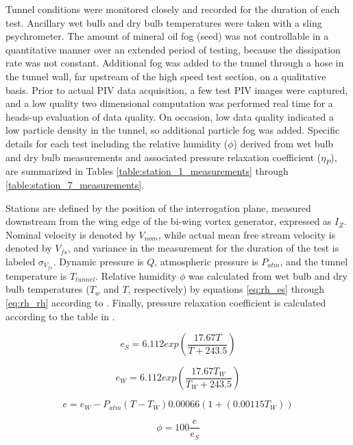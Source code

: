 Tunnel conditions were monitored closely and recorded for the duration of each 
test. Ancillary wet bulb and dry bulb temperatures were taken with a sling 
psychrometer. The amount of mineral oil fog (seed) was not controllable in a 
quantitative manner over an extended period of testing, because the dissipation 
rate was not constant. Additional fog was added to the tunnel through a hose in 
the tunnel wall, far upstream of the high speed test section, on a qualitative 
basis. Prior to actual PIV data acquisition, a few test PIV images 
were captured, and a low quality two dimensional computation was performed real 
time for a heads-up evaluation of data quality. 
On occasion, low data quality indicated a low particle density in the tunnel, 
so additional particle fog was added. 
Specific details for each test including the relative humidity ($\phi$) derived 
from wet bulb and dry bulb measurements and associated pressure relaxation 
coefficient 
($\eta_P$), are summarized in Tables \ref{table:station_1_measurements} through 
\ref{table:station_7_measurements}. 

Stations are defined by the position of the interrogation plane, measured 
downstream from the wing edge of the bi-wing vortex generator, expressed as
$I_Z$. Nominal velocity is denoted by $V_{nom}$, while actual mean free stream 
velocity is denoted by $V_{fs}$, and variance in the measurement for the 
duration of the test is labeled $\sigma_{V_{fs}}$. Dynamic pressure is $Q$, 
atmospheric 
pressure is $P_{atm}$, and the tunnel temperature is $T_{tunnel}$. Relative 
humidity $\phi$ was calculated from wet bulb and dry bulb temperatures ($T_w$ 
and $T$, respectively) by 
equations \ref{eq:rh_es} through \ref{eq:rh_rh} according to \cite{owen1977}. 
Finally, pressure relaxation coefficient is calculated according to the table 
in \cite{ash2011}.

\begin{equation}
e_S = 6.112 exp \left( \frac{17.67 T}{T + 243.5} \right)
\label{eq:rh_es}
\end{equation}

\begin{equation}
e_W = 6.112 exp \left( \frac{17.67 T_W}{T_W + 243.5} \right)
\label{eq:rh_ew}
\end{equation}

\begin{equation}
e = e_W - P_{atm} (T - T_W) 0.00066(1 +( 0.00115T_W))
\label{eq:rh_e}
\end{equation}

\begin{equation}
\phi = 100 \frac{e}{e_S}
\label{eq:rh_rh}
\end{equation}











